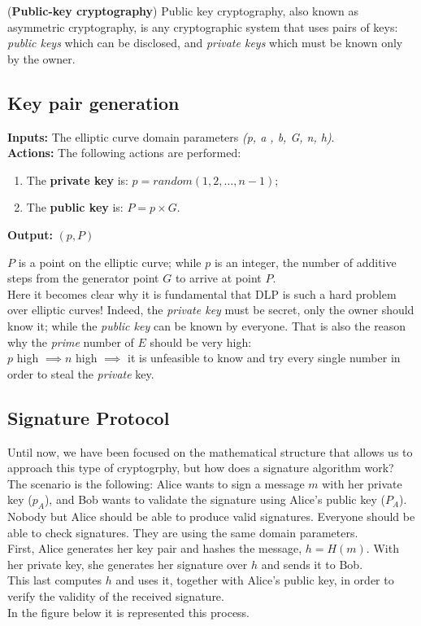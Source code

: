 \begin{teorema}{(\textbf{Public-key cryptography})}
	Public key cryptography, also known as asymmetric cryptography, is any cryptographic system that uses pairs of keys: \textit{public keys} which can be disclosed, and \textit{private keys} which must be known only by the owner.
\end{teorema}

\subsection{Key pair generation}
\textbf{Inputs:} The elliptic curve domain parameters \textit{(p, a , b, G, n, h)}. \\
\textbf{Actions:} The following actions are performed:

\hspace{1.1cm}
\begin{minipage}[l]{2\linewidth}
	\begin{enumerate}
		\item The \textbf{private key} is: $p=random({1, 2, \dots, n-1})$;
		\item The \textbf{public key} is: $P=p\times G$.\\
	\end{enumerate}
\end{minipage}
\textbf{Output:} $(p,P)$

$P$ is a point on the elliptic curve; while $p$ is an integer, the number of additive steps from the generator point $G$ to arrive at point $P$. \\
Here it becomes clear why it is fundamental that DLP is such a hard problem over elliptic curves! Indeed, the \textit{private key} must be secret, only the owner should know it; while the \textit{public key} can be known by everyone. That is also the reason why the \textit{prime} number of $E$ should be very high:\\
$p$ high $\implies n$ high $\implies$ it is unfeasible to know and try every single number in order to steal the \textit{private} key.
\subsection{Signature Protocol}
Until now, we have been focused on the mathematical structure that allows us to approach this type of cryptogrphy, but how does a signature algorithm work?\\
The scenario is the following: Alice wants to sign a message $m$ with her private key ($p_{A}$), and Bob wants to validate the signature using Alice's public key ($P_{A}$). Nobody but Alice should be able to produce valid signatures. Everyone should be able to check signatures. They are using the same domain parameters.\\
First, Alice generates her key pair and hashes the message, $h=H(m)$. With her private key, she generates her signature over $h$ and sends it to Bob.\\
This last computes $h$ and uses it, together with Alice's public key, in order to verify the validity of the received signature.\\
In the figure below it is represented this process.\\


